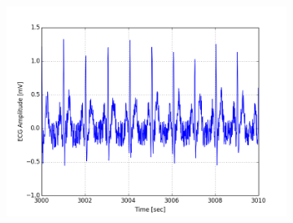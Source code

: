 \documentclass[paper=a4, fontsize=11pt]{scrartcl}
\numberwithin{equation}{section}		%
\numberwithin{figure}{section}			%
\numberwithin{table}{section}		    %
\begin{document}
\begin{appendices}
\begin{figure}[H]
\begin{subfigure}[b]{0.3\textwidth}
		\includegraphics[width=\textwidth]{sim/ecg_54}
	\end{subfigure}
\end{figure}


\end{appendices}
\end{document}
